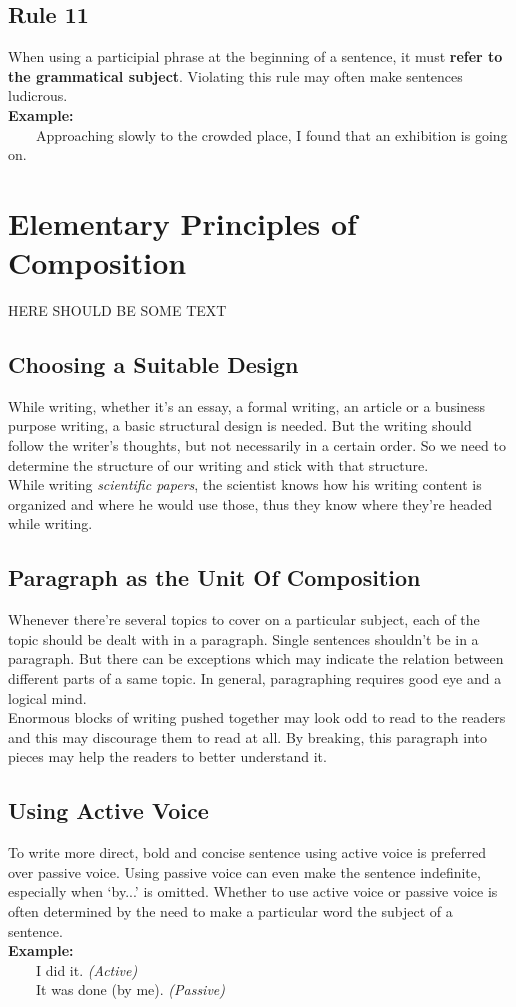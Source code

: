 \documentclass{report}
\newcommand{\xmpl}{\textbf{Example:}\\} %
\newcommand{\indnt}{\ \ \ \ } %
\begin{document}
\section{Rule 11}\label{rl11}
When using a participial phrase at the beginning of a sentence, it must \textbf{refer to the grammatical subject}. Violating this rule may often make sentences ludicrous.\\
\xmpl
\indnt Approaching slowly to the crowded place, I found that an exhibition is going on.

\chapter{Elementary Principles of Composition}
HERE SHOULD BE SOME TEXT

\section{Choosing a Suitable Design}
While writing, whether it's an essay, a formal writing, an article or a business purpose writing, a basic structural design is needed. But the writing should follow the writer's thoughts, but not necessarily in a certain order. So we need to determine the structure of our writing and stick with that structure.\\
While writing \emph{scientific papers}, the scientist knows how his writing content is organized and where he would use those, thus they know where they're headed while writing.
\section{Paragraph as the Unit Of Composition}
Whenever there're several topics to cover on a particular subject, each of the topic should be dealt with in a paragraph. Single sentences shouldn't be in a paragraph. But there can be exceptions which may indicate the relation between different parts of a same topic. In general, paragraphing requires good eye and a logical mind.\\
Enormous blocks of writing pushed together may look odd to read to the readers and this may discourage them to read at all. By breaking, this paragraph into pieces may help the readers to better understand it.
\section{Using Active Voice}
To write more direct, bold and concise sentence using active voice is preferred over passive voice. Using passive voice can even make the sentence indefinite, especially when `by...' is omitted. Whether to use active voice or passive voice is often determined by the need to make a particular word the subject of a sentence.\\
\xmpl
\indnt I did it. \emph{(Active)}\\
\indnt It was done (by me). \emph{(Passive)}
\end{document}
